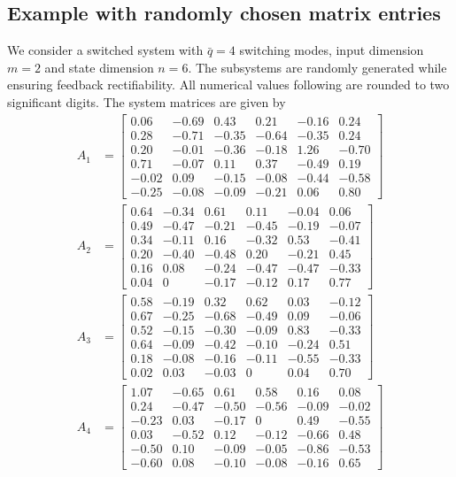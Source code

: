 \documentclass[11pt]{article}
\theoremstyle{plain}
\theoremstyle{definition}
\theoremstyle{remark}
\begin{document}
\subsection{Example with randomly chosen matrix entries}
We consider a switched system with $\bar q=4$ switching modes, input dimension $m=2$ and state dimension $n=6$. The subsystems are randomly generated while ensuring feedback rectifiability. All numerical values following are rounded to two significant digits. The system matrices are given by
\begin{align*}
    A_{1} &= \left[\begin{smallmatrix}
    0.06 & -0.69 & 0.43 & 0.21 & -0.16 & 0.24 \\
    0.28 & -0.71 & -0.35 & -0.64 & -0.35 & 0.24 \\
    0.20 & -0.01 & -0.36 & -0.18 & 1.26 & -0.70 \\
    0.71 & -0.07 & 0.11 & 0.37 & -0.49 & 0.19 \\
    -0.02 & 0.09 & -0.15 & -0.08 & -0.44 & -0.58 \\
    -0.25 & -0.08 & -0.09 & -0.21 & 0.06 & 0.80
\end{smallmatrix}\right]\\
    A_{2} &= \left[\begin{smallmatrix}
    0.64 & -0.34 & 0.61 & 0.11 & -0.04 & 0.06 \\
    0.49 & -0.47 & -0.21 & -0.45 & -0.19 & -0.07 \\
    0.34 & -0.11 & 0.16 & -0.32 & 0.53 & -0.41 \\
    0.20 & -0.40 & -0.48 & 0.20 & -0.21 & 0.45 \\
    0.16 & 0.08 & -0.24 & -0.47 & -0.47 & -0.33 \\
    0.04 & 0 & -0.17 & -0.12 & 0.17 & 0.77
\end{smallmatrix}\right]\\
    A_{3} &= \left[\begin{smallmatrix}
    0.58 & -0.19 & 0.32 & 0.62 & 0.03 & -0.12 \\
    0.67 & -0.25 & -0.68 & -0.49 & 0.09 & -0.06 \\
    0.52 & -0.15 & -0.30 & -0.09 & 0.83 & -0.33 \\
    0.64 & -0.09 & -0.42 & -0.10 & -0.24 & 0.51 \\
    0.18 & -0.08 & -0.16 & -0.11 & -0.55 & -0.33 \\
    0.02 & 0.03 & -0.03 & 0 & 0.04 & 0.70
\end{smallmatrix}\right]\\
 A_{4} &= \left[\begin{smallmatrix}
    1.07 & -0.65 & 0.61 & 0.58 & 0.16 & 0.08 \\
    0.24 & -0.47 & -0.50 & -0.56 & -0.09 & -0.02 \\
    -0.23 & 0.03 & -0.17 & 0 & 0.49 & -0.55 \\
    0.03 & -0.52 & 0.12 & -0.12 & -0.66 & 0.48 \\
    -0.50 & 0.10 & -0.09 & -0.05 & -0.86 & -0.53 \\
    -0.60 & 0.08 & -0.10 & -0.08 & -0.16 & 0.65
\end{smallmatrix}\right]
\end{align*}
\end{document}
